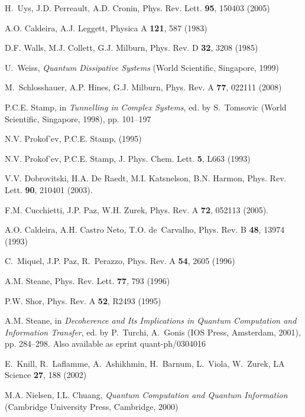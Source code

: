 \documentclass[aps,pra,reprint,amsmath,amssymb,showpacs,nofootinbib,floatfix,onecolumn,12pt]{revtex4-1}
\begin{document}
\begin{thebibliography}{100}
H.~Uys, J.D. Perreault, A.D. Cronin, Phys. Rev. Lett. \textbf{95}, 150403
  (2005)

A.O. Caldeira, A.J. Leggett, Physica A \textbf{121}, 587 (1983)

D.F. Walls, M.J. Collett, G.J. Milburn, Phys. Rev. D \textbf{32}, 3208 (1985)

U.~Weiss, \emph{Quantum Dissipative Systems} (World Scientific, Singapore,
  1999)

M.~Schlosshauer, A.P. Hines, G.J. Milburn, Phys. Rev. A \textbf{77}, 022111
  (2008)

P.C.E. Stamp, in \emph{Tunnelling in Complex Systems}, ed. by S.~Tomsovic
  (World Scientific, Singapore, 1998), pp. 101--197

N.V. Prokof{'}ev, P.C.E. Stamp,   (1995)

N.V. Prokof{'}ev, P.C.E. Stamp, J. Phys. Chem. Lett. \textbf{5}, L663 (1993)

V.V. Dobrovitski, H.A. {De Raedt}, M.I. Katsnelson, B.N. Harmon, Phys. Rev.
  Lett. \textbf{90}, 210401 (2003).
\newblock {}

F.M. Cucchietti, J.P. Paz, W.H. Zurek, Phys. Rev. A \textbf{72}, 052113 (2005).
\newblock {}

A.O. Caldeira, A.H. {Castro Neto}, T.O. de~Carvalho, Phys. Rev. B \textbf{48},
  13974 (1993)

C.~Miquel, J.P. Paz, R.~Perazzo, Phys. Rev. A \textbf{54}, 2605 (1996)

A.M. Steane, Phys. Rev. Lett. \textbf{77}, 793 (1996)

P.W. Shor, Phys. Rev. A \textbf{52}, R2493 (1995)

A.M. Steane, in \emph{Decoherence and Its Implications in Quantum Computation
  and Information Transfer}, ed. by P.~Turchi, A.~Gonis (IOS Press, Amsterdam,
  2001), pp. 284--298.
\newblock Also available as eprint quant-ph/0304016

E.~Knill, R.~Laflamme, A.~Ashikhmin, H.~Barnum, L.~Viola, W.~Zurek, LA Science
  \textbf{27}, 188 (2002)

M.A. Nielsen, I.L. Chuang, \emph{Quantum Computation and Quantum Information}
  (Cambridge University Press, Cambridge, 2000)


\end{thebibliography}
\end{document}
